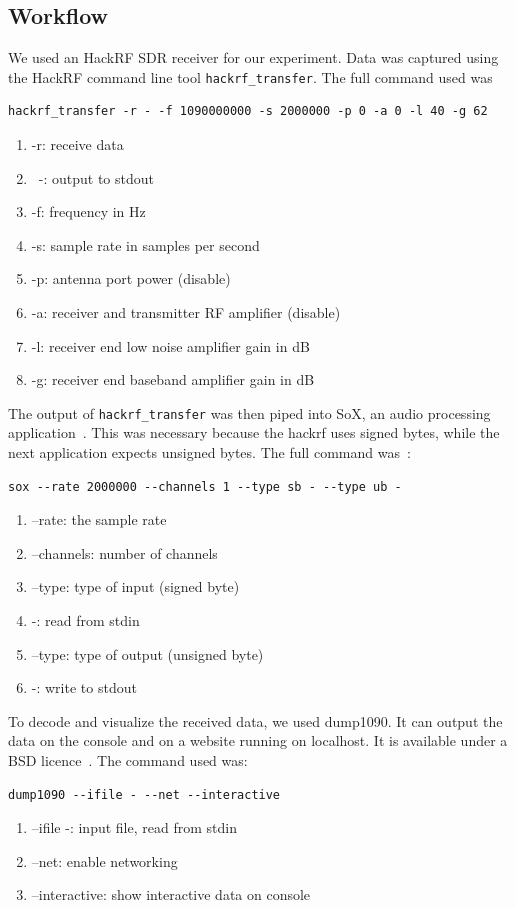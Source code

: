 \documentclass[conference]{IEEEtran}
\begin{document}
\subsection{Workflow}
We used an HackRF SDR receiver for our experiment. Data was captured using the HackRF command line tool \lstinline|hackrf_transfer|. The full command used was
\begin{lstlisting}
hackrf_transfer -r - -f 1090000000 -s 2000000 -p 0 -a 0 -l 40 -g 62
\end{lstlisting}
\begin{enumerate}
	\item -r: receive data
	\item ~-: output to stdout
	\item -f: frequency in Hz
	\item -s: sample rate in samples per second
	\item -p: antenna port power (disable)
	\item -a: receiver and transmitter RF amplifier (disable)
	\item -l: receiver end low noise amplifier gain in dB
	\item -g: receiver end baseband amplifier gain in dB
\end{enumerate}
The output of \lstinline|hackrf_transfer| was then piped into SoX, an audio processing application~\cite{SoX19}. This was necessary because the hackrf uses signed bytes, while the next application expects unsigned bytes. The full command was~\cite{Medium19ADS-B}:
\begin{lstlisting}
sox --rate 2000000 --channels 1 --type sb - --type ub -
\end{lstlisting}
\begin{enumerate}
	\item --rate: the sample rate
	\item --channels: number of channels
	\item --type: type of input (signed byte)
	\item -: read from stdin
	\item --type: type of output (unsigned byte)
	\item -: write to stdout
\end{enumerate}
To decode and visualize the received data, we used dump1090. It can output the data on the console and on a website running on localhost. It is available under a BSD licence~\cite{dump109019Github}. The command used was:
\begin{lstlisting}
dump1090 --ifile - --net --interactive
\end{lstlisting}
\begin{enumerate}
	\item --ifile -: input file, read from stdin
	\item --net: enable networking
	\item --interactive: show interactive data on console
\end{enumerate}
\end{document}
